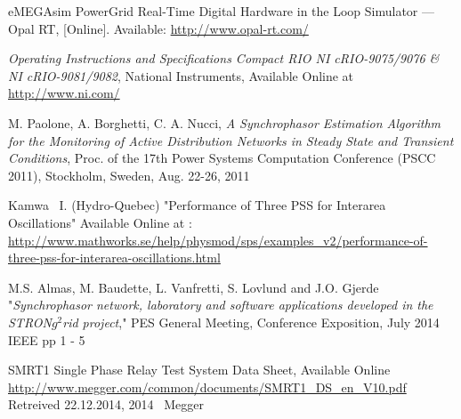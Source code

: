 \documentclass[conference]{IEEEtran}
\begin{document}
\begin{thebibliography}{1}
 eMEGAsim PowerGrid Real-Time Digital Hardware in the Loop Simulator — Opal RT, [Online]. Available: \url{http://www.opal-rt.com/}

 \emph{Operating Instructions and Specifications Compact RIO NI cRIO-9075/9076 \& NI cRIO-9081/9082}, National Instruments, Available Online at \url{http://www.ni.com/}

 M. Paolone, A. Borghetti, C. A. Nucci, \emph{A Synchrophasor Estimation Algorithm for the Monitoring of Active Distribution Networks in Steady State and Transient Conditions}, Proc. of the 17th Power Systems Computation Conference (PSCC 2011), Stockholm, Sweden, Aug. 22-26, 2011 

 Kamwa \ I. (Hydro-Quebec) "Performance of Three PSS for Interarea Oscillations" Available Online at : \url{http://www.mathworks.se/help/physmod/sps/examples_v2/performance-of-three-pss-for-interarea-oscillations.html}



 M.S. Almas, M. Baudette, L. Vanfretti, S. Lovlund and J.O. Gjerde "\emph{Synchrophasor network, laboratory and software applications developed in the STRON$g^{2}$rid project}," PES General Meeting, Conference Exposition, July 2014 IEEE pp 1 - 5

 SMRT1 Single Phase Relay Test System Data Sheet, Available Online \url{http://www.megger.com/common/documents/SMRT1_DS_en_V10.pdf} Retreived 22.12.2014, 2014 \textcopyright~Megger





\end{thebibliography}
\end{document}
